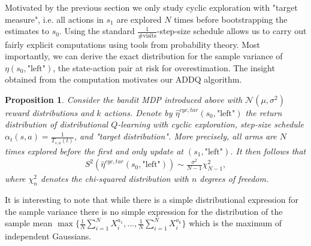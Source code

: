 \documentclass{article}
\theoremstyle{plain}
\newtheorem{proposition}[theorem]{Proposition}
\theoremstyle{definition}
\theoremstyle{remark}
\begin{document}
Motivated by the previous section we only study cyclic exploration with "target measure", i.e. all actions in $s_1$ are explored $N$ times before bootstrapping the estimates to $s_0$. Using the standard $\frac{1}{\# \text{visits}}$-step-size schedule allows us to carry out fairly explicit computations using tools from probability theory. Most importantly, we can derive the exact distribution for the sample variance of $\eta(s_0,\text{"left"})$, the state-action pair at risk for overestimation. The insight obtained from the computation motivates our ADDQ algorithm.
\begin{proposition}\label{prop1}
    Consider the bandit MDP introduced above with $\mathcal N(\mu,\sigma^2)$ reward distributions and $k$ actions. Denote by $\hat{ \eta}^{cyc,tar}(s_0,\text{"left"})$ the return distribution of distributional $Q$-learning with cyclic exploration, step-size schedule $\alpha_t(s,a)=\frac{1}{T_{s,a}(t)}$, and "target distribution". More precisely, all arms are $N$ times explored before the first and only update at $(s_1,\text{"left"})$. It then follows that
    \begin{align*}
            S^2 (\hat{ \eta}^{cyc,tar}(s_0,\text{"left"}))\sim \frac{\sigma^2}{N-1} \chi_{N-1}^2,
    \end{align*}
    where $\chi_n^2$ denotes the chi-squared distribution with $n$ degrees of freedom.


    
\end{proposition}
It is interesting to note that while there is a simple distributional expression for the sample variance there is no simple expression for the distribution of the sample mean $\max\{\frac{1}{N}\sum_{i=1}^N X_i^{a_1},...,\frac{1}{N}\sum_{i=1}^N X_i^{a_k}\}$ which is the maximum of independent Gaussians.
\end{document}
